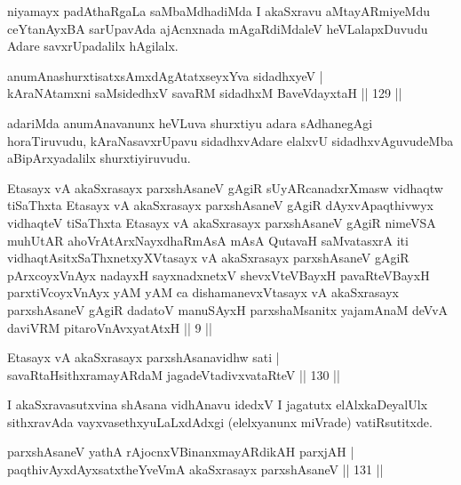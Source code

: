 \begin{artha}%
niyamayx padAthaRgaLa saMbaMdhadiMda I akaSxravu aMtayARmiyeMdu ceYtanAyxBA sarUpavAda ajAcnxnada mAgaRdiMdaleV heVLalapxDuvudu Adare savxrUpadalilx hAgilalx.
\end{artha}

\begin{shl}
anumAnashurxtisatxsAmxdAgAtatxseyxYva sidadhxyeV |\\
kAraNAtamxni saMsidedhxV savaRM sidadhxM BaveVdayxtaH \hfill || 129 ||
\end{shl}

\begin{artha}
adariMda anumAnavanunx heVLuva shurxtiyu adara sAdhanegAgi horaTiruvudu, kAraNasavxrUpavu sidadhxvAdare elalxvU sidadhxvAguvudeMba aBipArxyadalilx shurxtiyiruvudu.
\end{artha}


\begin{kandikeshl}
Etasayx vA akaSxrasayx parxshAsaneV gAgiR sUyARcanadxrXmasw vidhaqtw tiSaThxta Etasayx vA akaSxrasayx parxshAsaneV gAgiR dAyxvApaqthivwyx vidhaqteV tiSaThxta Etasayx vA akaSxrasayx parxshAsaneV gAgiR nimeVSA muhUtAR ahoVrAtArxNayxdhaRmAsA mAsA QutavaH saMvatasxrA iti vidhaqtAsitxSaThxnetxyXVtasayx vA akaSxrasayx parxshAsaneV gAgiR pArxcoyxV\s nAyx nadayxH sayxnadxnetxV shevxVteVBayxH pavaRteVBayxH parxtiVcoyxV\s nAyx yAM yAM ca dishamanevxVtasayx vA akaSxrasayx parxshAsaneV gAgiR dadatoV manuSAyxH parxshaMsanitx yajamAnaM deVvA daviVRM pitaroV\s nAvxyatAtxH || 9 ||
\end{kandikeshl}

\begin{shl}
Etasayx vA akaSxrasayx parxshAsanavidhw sati |\\
savaRtaHsithxramayARdaM jagadeVtadivxvataRteV \hfill || 130 ||
\end{shl}

\begin{artha}%
I akaSxravasutxvina shAsana vidhAnavu idedxV I jagatutx elAlxkaDeyalUlx sithxravAda vayxvasethxyuLaLxdAdxgi (elelxyanunx miVrade) vatiRsutitxde.
\end{artha}

\begin{shl}
parxshAsaneV yathA rAjocnxV\s BinanxmayARdikAH parxjAH |\\
paqthivAyxdAyxsatxtheYveVmA akaSxrasayx parxshAsaneV \hfill || 131 ||
\end{shl}

